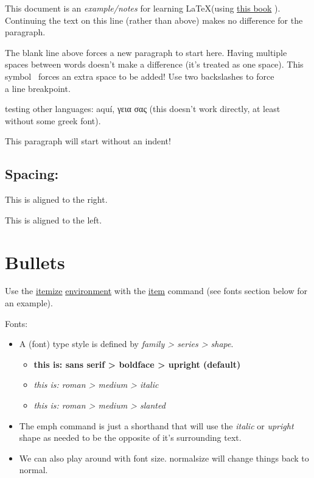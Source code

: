 \documentclass{article}
\begin{document}
This document is an \emph{example/notes} for learning \LaTeX (using \href{https://www.tug.org/twg/mactex/tutorials/ltxprimer-1.0.pdf}{this book} ).
Continuing the text on this line (rather than above) makes no difference for the paragraph.

The blank line above forces a new paragraph to start here.
Having multiple         spaces between words doesn't make a difference (it's treated as one space).
This symbol \ forces an extra space to be added!
Use two backslashes to force\\
a line breakpoint.

testing other languages: aquí, γεια σας (this doesn't work directly, at least without some greek font).


\noindent This paragraph will start without an indent!


\begin{center}
  \section{Spacing:}
\end{center}

\begin{flushright}
  This is aligned to the right.
\end{flushright}
\begin{flushleft}
  This is aligned to the left.
\end{flushleft}


\section{Bullets}
Use the \underline{itemize} \href{https://www.overleaf.com/learn/latex/Environments}{environment} with the \underline{item} command (see fonts section below for an example).


\begin{center}
  Fonts:
\end{center}


\begin{itemize}
  \item A (font) type style is defined by \emph{family > series > shape}.
  \begin{itemize}
    \item \textsf{\textbf{this is: sans serif > boldface > upright (default)}}
    \item \textrm{\textmd{\textit{this is: roman > medium > italic}}}
    \item \textrm{\textmd{\textsl{this is: roman > medium > slanted}}}
  \end{itemize}

  \item The emph command is just a shorthand that will use the \emph{italic} or \emph{upright} shape as needed to be the opposite of it's surrounding text.
  \item We \tiny{can} also \scriptsize{play around} with \huge{font size}.  normalsize will \normalsize{} change things back to normal.
\end{itemize}
\end{document}
